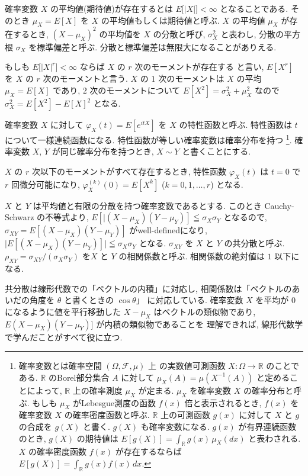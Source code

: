 \documentclass[12pt,twoside]{jarticle}
\newcommand\R{{\mathbb R}} %
\theoremstyle{jplain}
\theoremstyle{jplain}
\theoremstyle{jplain}
\numberwithin{theorem}{section}
\numberwithin{equation}{section}
\numberwithin{figure}{section}
\numberwithin{table}{section}
\begin{document}
確率変数 $X$ の平均値(期待値)が存在するとは $E\bigl[|X|\bigr]<\infty$ となることである.
そのとき $\mu_X=E[X]$ を $X$ の平均値もしくは期待値と呼ぶ.
$X$ の平均値 $\mu_X$ が存在するとき,
$(X-\mu_X)^2$ の平均値を $X$ の分散と呼び,
$\sigma_X^2$ と表わし, 分散の平方根 $\sigma_X$ を標準偏差と呼ぶ.
分散と標準偏差は無限大になることがありえる.

もしも $E\bigl[|X|^r\bigr]<\infty$ ならば $X$ の $r$ 次のモーメントが存在する
と言い, $E[X^r]$ を $X$ の $r$ 次のモーメントと言う.
$X$ の $1$ 次のモーメントは $X$ の平均 $\mu_X=E[X]$ であり,
$2$ 次のモーメントについて $E[X^2]=\sigma_X^2+\mu_X^2$
なので $\sigma_X^2=E[X^2]-E[X]^2$ となる.

確率変数 $X$ に対して $\varphi_X(t)=E[e^{itX}]$ を $X$ の特性函数と呼ぶ.
特性函数は $t$ について一様連続函数になる.
特性函数が等しい確率変数は確率分布を持つ%
\footnote{確率変数とは確率空間 $(\Omega,\mathcal{F},\mu)$ 上
の実数値可測函数 $X:\Omega\to\R$ のことである.
$\R$ のBorel部分集合 $A$ に対して $\mu_X(A)=\mu(X^{-1}(A))$ と定めることによって,
$\R$ 上の確率測度 $\mu_X$ が定まる. $\mu_X$ を確率変数 $X$ の確率分布と呼ぶ.
もしも $\mu_X$ がLebesgue測度の函数 $f(x)$ 倍と表示されるとき,
$f(x)$ を確率変数 $X$ の確率密度函数と呼ぶ.
$\R$ 上の可測函数 $g(x)$ に対して $X$ と $g$ の合成を $g(X)$ と書く.
$g(X)$ も確率変数になる.
$g(x)$ が有界連続函数のとき,
$g(X)$ の期待値は $E[g(X)]=\int_\R g(x)\,\mu_X(dx)$ と表わされる.
$X$ の確率密度函数 $f(x)$ が存在するならば $E[g(X)]=\int_\R g(x)f(x)\,dx$.
}.
確率変数 $X$, $Y$ が同じ確率分布を持つとき, $X\sim Y$ と書くことにする.

$X$ の $r$ 次以下のモーメントがすべて存在するとき,
特性函数 $\varphi_X(t)$ は $t=0$ で $r$ 回微分可能になり,
$\varphi_X^{(k)}(0)=E[X^k]$ ($k=0,1,\ldots,r$) となる.

$X$ と $Y$ は平均値と有限の分散を持つ確率変数であるとする.
このとき Cauchy-Schwarz の不等式より,
$E[|(X-\mu_X)(Y-\mu_Y)]\leqq\sigma_X\sigma_Y$ となるので,
$\sigma_{XY}=E[(X-\mu_X)(Y-\mu_Y)]$ がwell-definedになり,
$\bigl|E[(X-\mu_X)(Y-\mu_Y)]\bigr|\leqq\sigma_X\sigma_Y$ となる.
$\sigma_{XY}$ を $X$ と $Y$ の共分散と呼ぶ.
$\rho_{XY}=\sigma_{XY}/(\sigma_X\sigma_Y)$ を$X$ と $Y$ の相関係数と呼ぶ.
相関係数の絶対値は $1$ 以下になる.

共分散は線形代数での「ベクトルの内積」に対応し,
相関係数は「ベクトルのあいだの角度を $\theta$ と書くときの $\cos\theta$」
に対応している.
確率変数 $X$ を平均が $0$ になるように値を平行移動した $X-\mu_X$
はベクトルの類似物であり, $E(X-\mu_X)(Y-\mu_Y)]$ が内積の類似物であることを
理解できれば, 線形代数学で学んだことがすべて役に立つ.
\end{document}

